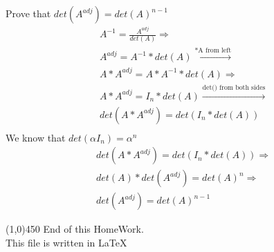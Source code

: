 \documentclass[a4paper,12pt]{article}
\begin{document}
\begin{doublespace}
Prove that $det(A^{adj}) = det(A)^{n-1} $\\
	\begin{align*}
		&A^{-1} = \frac{A^{adj}}{det(A)} \Rightarrow \\
		 &A^{adj} = A^{-1} *  det(A) \xrightarrow{\text{*A from left}} \\
		&A * A^{adj} = A*A^{-1} *  det(A) \Rightarrow \\
		&A * A^{adj} = I_n * det(A) \xrightarrow{\text{det() from both sides}} \\
		&det(A * A^{adj}) =det( I_n * det(A))\\
	\end{align*}
We know that $ det(\alpha I_n) = \alpha^n $\\
	\begin{align*}
	&det(A * A^{adj}) =det( I_n * det(A)) \Rightarrow \\
	&det(A) * det(A^{adj}) =  det(A)^n \Rightarrow \\
	&det(A^{adj}) = det(A)^{n-1}
	\end{align*}
\end{doublespace}
\line(1,0){450}
\newpage
End of this HomeWork.\\
This file is written in \LaTeX
\end{document}
